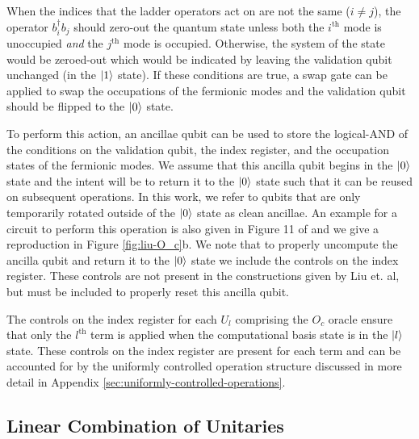 When the indices that the ladder operators act on are not the same ($i \neq j$), the operator $b_i^\dagger b_j$ should zero-out the quantum state unless both the $i^\text{th}$ mode is unoccupied \textit{and} the $j^\text{th}$ mode is occupied.
Otherwise, the system of the state would be zeroed-out which would be indicated by leaving the validation qubit unchanged (in the $\ket{1}$ state).
If these conditions are true, a swap gate can be applied to swap the occupations of the fermionic modes and the validation qubit should be flipped to the $\ket{0}$ state. 

To perform this action, an ancillae qubit can be used to store the logical-AND of the conditions on the validation qubit, the index register, and the occupation states of the fermionic modes.
We assume that this ancilla qubit begins in the $\ket{0}$ state and the intent will be to return it to the $\ket{0}$ state such that it can be reused on subsequent operations.
In this work, we refer to qubits that are only temporarily rotated outside of the $\ket{0}$ state as clean ancillae.
An example for a circuit to perform this operation is also given in Figure 11 of \cite{liu2024efficient} and we give a reproduction in Figure \ref{fig:liu-O_c}b.
We note that to properly uncompute the ancilla qubit and return it to the $\ket{0}$ state we include the controls on the index register.
These controls are not present in the constructions given by Liu et. al, but must be included to properly reset this ancilla qubit.

The controls on the index register for each $U_l$ comprising the $O_c$ oracle ensure that only the $l^\text{th}$ term is applied when the computational basis state is in the $\ket{l}$ state.
These controls on the index register are present for each term and can be accounted for by the uniformly controlled operation structure discussed in more detail in Appendix \ref{sec:uniformly-controlled-operations}.



\subsection{Linear Combination of Unitaries}
\label{subsec:lcu}

